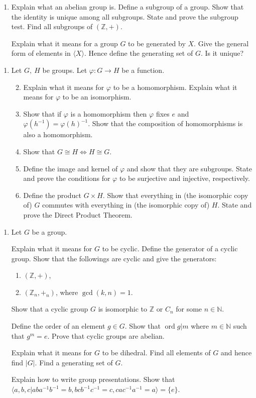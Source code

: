 \documentclass[11pt]{article}
\newlength{\qspace}
\newcounter{qnumber}
\newenvironment{question}%
 {\vspace{\qspace}
  \begin{enumerate}[\bfseries 1\quad][10]%
    \setcounter{enumi}{\value{qnumber}}%
    \item%
 }
{
  \end{enumerate}
  \filbreak
  \stepcounter{qnumber}
 }
\newenvironment{questionparts}[1][1]%
 {
  \begin{enumerate}[\bfseries (i)]%
    \setcounter{enumii}{#1}
    \addtocounter{enumii}{-1}
    \setlength{\parskip}{3pt}
 }
 {
  \end{enumerate}
 }
\begin{document}
\begin{question}
Explain what an abelian group is. Define a subgroup of a group. Show that the identity is unique among all subgroups. State and prove the subgroup test.
Find all subgroups of $ (\mathbb{Z} ,+) $.

Explain what it means for a group $G$ to be generated by $X$. Give the general form of elements in $ \langle X \rangle  $. Hence define the generating set of $G$. Is it unique?
\end{question}

\begin{question}
  Let $ G,\ H $ be groups. Let $ \varphi: G\to H $ be a function.

  \begin{questionparts}
    \item Explain what it means for $ \varphi $ to be a homomorphism. Explain what it means for $ \varphi $ to be an isomorphism.
    \item Show that if $ \varphi $ is a homomorphism then $ \varphi $ fixes $e$ and $ \varphi (h^{-1})=\varphi (h)^{-1} $. Show that the composition of homomorphisms is also a homomorphism.
    \item Show that $ G \cong H \Leftrightarrow H \cong G $.
    \item Define the image and kernel of $ \varphi $ and show that they are subgroups. State and prove the conditions for $ \varphi $ to be surjective and injective, respectively.
    \item Define the product $ G \times H $. Show that everything in (the isomorphic copy of) $G$ commutes with everything in (the isomorphic copy of) $H$. State and prove the Direct Product Theorem.
  \end{questionparts}
\end{question}
\begin{question}
  Let $G$ be a group. 
  
  Explain what it means for $G$ to be cyclic. Define the generator of a cyclic group. Show that the followings are cyclic and give the generators:
    \begin{enumerate}
      \item $ (\mathbb{Z} ,+) $,
      \item $ (\mathbb{Z}_n, +_n) $, where $ \gcd(k,n)=1 $.
    \end{enumerate}
  
  Show that a cyclic group $G$ is isomorphic to $ \mathbb{Z}  $ or $ C_n $ for some $ n\in \mathbb{N} $.

  Define the order of an element $ g\in G $. Show that $ \operatorname{ord} g |m$ where $ m\in \mathbb{N} $ such that $ g^m=e $. Prove that cyclic groups are abelian.

  Explain what it means for $G$ to be dihedral. Find all elements of $G$ and hence find $ |G| $. Find a generating set of $G$.

  Explain how to write group presentations. Show that $ \langle a,b,c| aba^{-1}b^{-1}=b, bcb^{-1}c^{-1}=c, cac^{-1}a^{-1}=a \rangle=\{e\} $.
\end{question}
\end{document}
